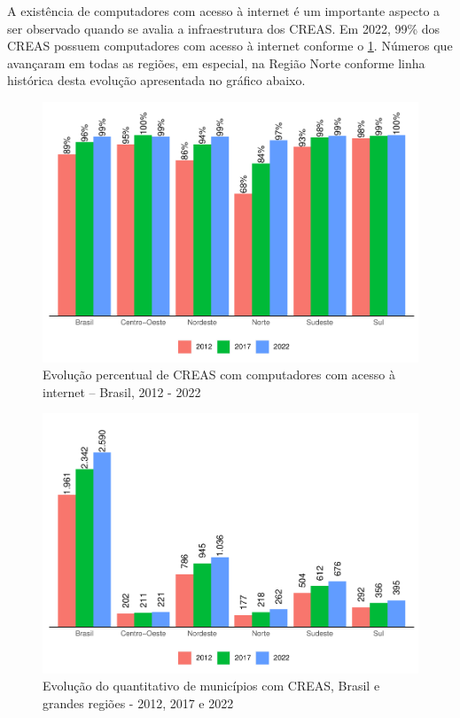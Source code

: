 \documentclass[
  brazilian]{report}
\begin{document}
A existência de computadores com acesso à internet é um importante
aspecto a ser observado quando se avalia a infraestrutura dos CREAS. Em
2022, 99\% dos CREAS possuem computadores com acesso à internet conforme
o \cref{fig:CREAS-internet-percentual}. Números que avançaram em todas
as regiões, em especial, na Região Norte conforme linha histórica desta
evolução apresentada no gráfico abaixo.

\begin{figure}
\includegraphics{Censo-SUAS-2022_files/figure-latex/CREAS-internet-percentual-1} \caption[Evolução percentual de CREAS com computadores com acesso à internet – Brasil, 2012 - 2022]{Evolução percentual de CREAS com computadores com acesso à internet – Brasil, 2012 - 2022}\label{fig:CREAS-internet-percentual}
\end{figure}

\begin{figure}
\includegraphics{Censo-SUAS-2022_files/figure-latex/CREAS-quantidade-municipios-1} \caption[Evolução do quantitativo de municípios com CREAS, Brasil e grandes regiões - 2012, 2017 e 2022]{Evolução do quantitativo de municípios com CREAS, Brasil e grandes regiões - 2012, 2017 e 2022}\label{fig:CREAS-quantidade-municipios}
\end{figure}
\end{document}
